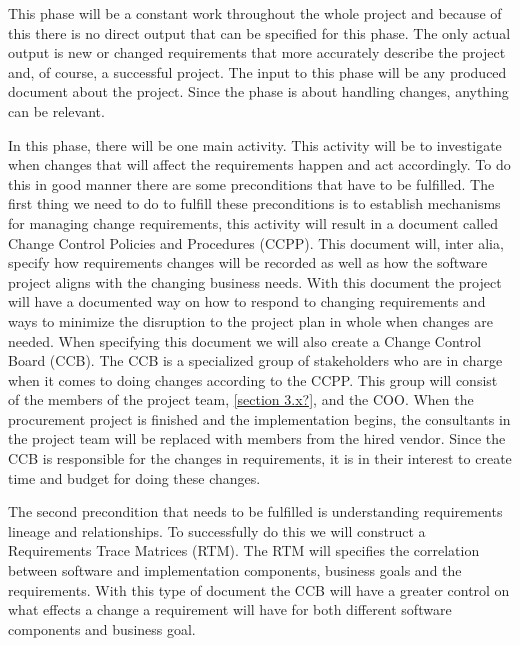 \documentclass[a4paper]{article}
\begin{document}
This phase will be a constant work throughout the whole project and because of this there is no direct output that can be specified for this phase. The only actual output is new or changed requirements that more accurately describe the project and, of course, a successful project. The input to this phase will be any produced document about the project. Since the phase is about handling changes, anything can be relevant.

In this phase, there will be one main activity. This activity will be to investigate when changes that will affect the requirements happen and act accordingly. To do this in good manner there are some preconditions that have to be fulfilled\cite{gott282}. The first thing we need to do to fulfill these preconditions is to establish mechanisms for managing change requirements, this activity will result in a document called Change Control Policies and Procedures (CCPP). This document will, inter alia, specify how requirements changes will be recorded as well as how the software project aligns with the changing business needs. With this document the project will have a documented way on how to respond to changing requirements and ways to minimize the disruption to the project plan in whole when changes are needed. When specifying this document we will also create a Change Control Board (CCB). The CCB is a specialized group of stakeholders who are in charge when it comes to doing changes according to the CCPP. This group will consist of the members of the project team, \ref{section 3.x?}, and the COO. When the procurement project is finished and the implementation begins, the consultants in the project team will be replaced with members from the hired vendor. Since the CCB is responsible for the changes in requirements, it is in their interest to create time and budget for doing these changes.

The second precondition that needs to be fulfilled is understanding requirements lineage and relationships. To successfully do this we will construct a Requirements Trace Matrices (RTM). The RTM will specifies the correlation between software and implementation components, business goals and the requirements. With this type of document the CCB will have a greater control on what effects a change a requirement will have for both different software components and business goal. 
\end{document}
